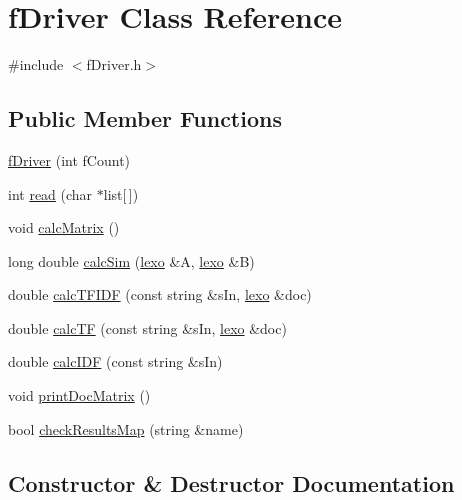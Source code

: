 \hypertarget{classf_driver}{}\section{f\+Driver Class Reference}
\label{classf_driver}


{\ttfamily \#include $<$f\+Driver.\+h$>$}

\subsection*{Public Member Functions}
\begin{DoxyCompactItemize}
\item 
\hyperlink{classf_driver_a2130b13a27f66afccd9e3f688501eac6}{f\+Driver} (int f\+Count)
\item 
int \hyperlink{classf_driver_ae1b18456f82da03bf23f7217507d40bd}{read} (char $\ast$list\mbox{[}$\,$\mbox{]})
\item 
void \hyperlink{classf_driver_afe5f65a9ff4b8a45c511c76fedcdd351}{calc\+Matrix} ()
\item 
long double \hyperlink{classf_driver_ad65711cd54645b076ea7cda7d841bea8}{calc\+Sim} (\hyperlink{classlexo}{lexo} \&A, \hyperlink{classlexo}{lexo} \&B)
\item 
double \hyperlink{classf_driver_a0f0f6e60df4bf45941fab363f2c7ab94}{calc\+T\+F\+I\+DF} (const string \&s\+In, \hyperlink{classlexo}{lexo} \&doc)
\item 
double \hyperlink{classf_driver_adb6048455efd56b2c4735ac7ea10f563}{calc\+TF} (const string \&s\+In, \hyperlink{classlexo}{lexo} \&doc)
\item 
double \hyperlink{classf_driver_aaddb40ecbf0340639b751ed266d4d6f4}{calc\+I\+DF} (const string \&s\+In)
\item 
void \hyperlink{classf_driver_a4e79fecb4fcd359ed41444a400ade6fa}{print\+Doc\+Matrix} ()
\item 
bool \hyperlink{classf_driver_a08b48a7ce8c3666a1fb7617280ef1ebd}{check\+Results\+Map} (string \&name)
\end{DoxyCompactItemize}


\subsection{Constructor \& Destructor Documentation}
\mbox{\label{classf_driver_a2130b13a27f66afccd9e3f688501eac6}} 
